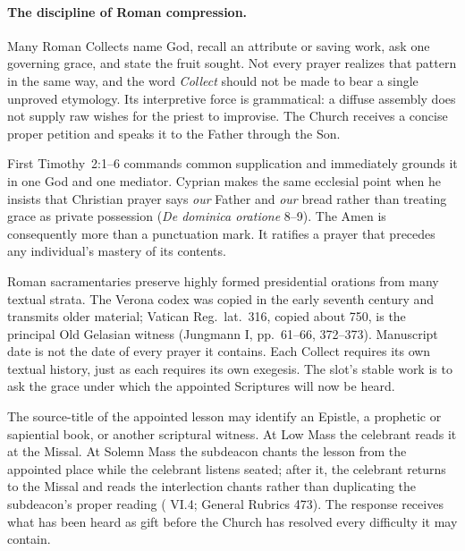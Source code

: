 \paragraph{The discipline of Roman compression.}
Many Roman Collects name God, recall an attribute or saving work, ask one governing grace, and state the fruit sought. Not every prayer realizes that pattern in the same way, and the word \emph{Collect} should not be made to bear a single unproved etymology. Its interpretive force is grammatical: a diffuse assembly does not supply raw wishes for the priest to improvise. The Church receives a concise proper petition and speaks it to the Father through the Son.

First Timothy~2:1--6 commands common supplication and immediately grounds it in one God and one mediator. Cyprian makes the same ecclesial point when he insists that Christian prayer says \emph{our} Father and \emph{our} bread rather than treating grace as private possession (\emph{De dominica oratione} 8--9). The Amen is consequently more than a punctuation mark. It ratifies a prayer that precedes any individual's mastery of its contents.

Roman sacramentaries preserve highly formed presidential orations from many textual strata. The Verona codex was copied in the early seventh century and transmits older material; Vatican Reg.~lat.~316, copied about 750, is the principal Old Gelasian witness (Jungmann I, pp.~61--66, 372--373). Manuscript date is not the date of every prayer it contains. Each Collect requires its own textual history, just as each requires its own exegesis. The slot's stable work is to ask the grace under which the appointed Scriptures will now be heard.


The source-title of the appointed lesson may identify an Epistle, a prophetic or sapiential book, or another scriptural witness. At Low Mass the celebrant reads it at the Missal. At Solemn Mass the subdeacon chants the lesson from the appointed place while the celebrant listens seated; after it, the celebrant returns to the Missal and reads the interlection chants rather than duplicating the subdeacon's proper reading ( VI.4; General Rubrics 473). The response  receives what has been heard as gift before the Church has resolved every difficulty it may contain.

